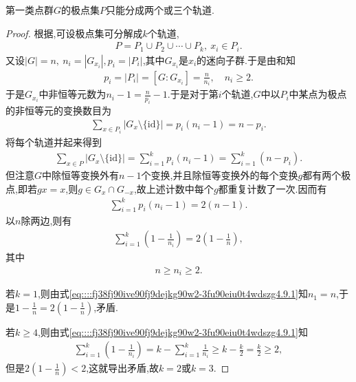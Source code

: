 \documentclass[../../main.tex]{subfiles}%
\begin{document}
\begin{theorem}
第一类点群$G$的极点集$P$只能分成两个或三个轨道.
\end{theorem}
\begin{proof}

根据,可设极点集可分解成$k$个轨道,
\begin{align*}
P=P_1\cup P_2\cup\cdots\cup P_k,\ x_i\in P_i.
\end{align*}
又设$|G|=n,\ n_i=|G_{x_i}|,p_i=|P_i|$,其中$G_{x_i}$是$x_i$的迷向子群.于是由和知
\begin{align*}
p_i=|P_i|=[G:G_{x_i}]=\frac{n}{n_i},\quad n_i\geqslant 2.
\end{align*}
于是$G_{x_i}$中非恒等元数为$n_i-1=\frac{n}{p_i}-1$.于是对于第$i$个轨道,$G$中以$P_i$中某点为极点的非恒等元的变换数目为
\begin{align*}
\sum\limits_{x\in P_i}|G_x\setminus\{\text{id}\}|=p_i(n_i-1)=n-p_i.
\end{align*}
将每个轨道并起来得到
\begin{align*}
\sum_{x\in P}{|G_x\setminus \{\mathrm{id}\}|}=\sum\limits_{i=1}^k p_i(n_i-1)=\sum\limits_{i=1}^k(n-p_i).
\end{align*}
但注意$G$中除恒等变换外有$n-1$个变换,并且除恒等变换外的每个变换$g$都有两个极点,即若$gx=x$,则$g\in G_x\cap G_{-x}$,故上述计数中每个$g$都重复计数了一次.因而有
\begin{align*}
\sum\limits_{i=1}^k p_i(n_i-1)=2(n-1).
\end{align*}
以$n$除两边,则有
\begin{align}
\sum\limits_{i=1}^k\left(1-\frac{1}{n_i}\right)=2\left(1-\frac{1}{n}\right),\label{eq::::fj38fj90ive90fj9dejkg90w2-3fu90eiu0t4wdszg4.9.1}
\end{align}
其中
\begin{align*}
n\geqslant n_i\geqslant 2.
\end{align*}

若$k=1$,则由式\eqref{eq::::fj38fj90ive90fj9dejkg90w2-3fu90eiu0t4wdszg4.9.1}知$n_1=n$,于是$1-\frac{1}{n}=2\left(1-\frac{1}{n}\right)$,矛盾.

若$k\geqslant 4$,则由式\eqref{eq::::fj38fj90ive90fj9dejkg90w2-3fu90eiu0t4wdszg4.9.1}知
\begin{align*}
\sum\limits_{i=1}^k\left(1-\frac{1}{n_i}\right)=k-\sum\limits_{i=1}^k\frac{1}{n_i}\geqslant k-\frac{k}{2}=\frac{k}{2}\geqslant 2,
\end{align*}
但是$2\left(1-\frac{1}{n}\right)<2$,这就导出矛盾,故$k=2$或$k=3$.


\end{proof}
\end{document}
